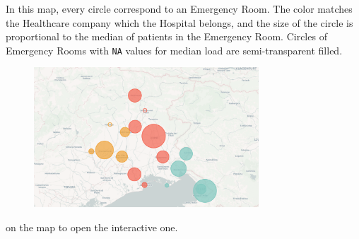 \documentclass[8pt,english,aspectratio=169]{beamer}
\begin{document}
\begin{frame}
In this map, every circle correspond to an Emergency Room. The color matches the Healthcare company which the Hospital belongs, and the size of the circle is proportional to the median of patients in the Emergency Room. Circles of Emergency Rooms with \texttt{NA} values for median load are semi-transparent filled.
\begin{figure}
  \centering
  \href{http://uniud.enricostefanel.it/datascience/project/images/map.html}{\includegraphics[width=0.75\textwidth]{../images/map.pdf}}
\end{figure}
\scriptsize \href{http://uniud.enricostefanel.it/datascience/project/images/map.html}{\color{gray}{Click}} on the map to open the interactive one.

\end{frame}
\end{document}
